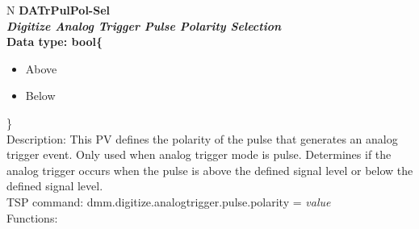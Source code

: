 \documentclass[openany]{article}
\begin{document}
		\begin{tabular}{N}
			\hline
			\bfseries DATrPulPol-Sel\label{pv:datrpulpol-sel} \\ \hline
			\emph{Digitize Analog Trigger Pulse Polarity Selection} \\
			Data type: bool\{\begin{itemize}[noitemsep]
				\small
				\item[] Above
				\item[] Below
			\end{itemize}\} \\
			Description: This PV defines the polarity of the pulse that generates an analog trigger event. Only used when analog trigger mode is pulse. Determines if the analog trigger occurs when the pulse is above the defined signal level or below the defined signal level. \\
			TSP command: dmm.digitize.analogtrigger.pulse.polarity = \emph{value} \\
			Functions: \\
			\arrayrulecolor{\FuncTableBorderColor}

		\end{tabular}
\end{document}
